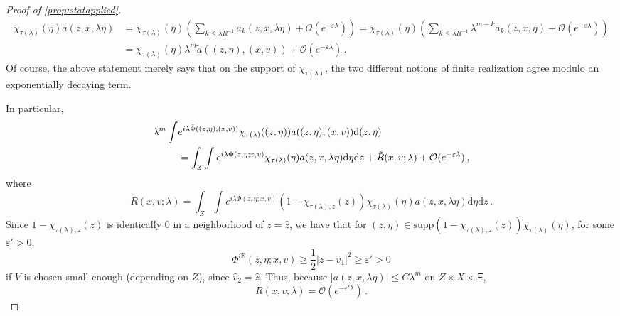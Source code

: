 \documentclass[
	fontsize=11pt, 
	twoside=false, 
	abstract=true, 
	a4paper,
]{scrartcl}
\newcommand{\eps}{\varepsilon}
\newcommand{\RR}{\mathbb{R}}
\newcommand{\dd}{\mathrm{d}}
\newcommand{\abs}[1]{\left\lvert#1\right\rvert}
\newcommand{\supp}{\mathrm{supp}}
\newcommand{\td}[1]{\tilde{#1}}
\begin{document}
\begin{proof}[Proof of \cref{prop:statapplied}]
	\begin{align*}%
		\chi_{\tau(\lambda)}(\eta)a(z,x,\lambda\eta) &= \chi_{\tau(\lambda)}(\eta)\left(\sum_{k \leq \lambda R^{-1}} a_k(z,x,\lambda\eta) + \mathcal{O}(e^{-\eps\lambda})\right) = \chi_{\tau(\lambda)}(\eta)\left(\sum_{k \leq \lambda R^{-1}} \lambda^{m-k}a_k(z,x,\eta) + \mathcal{O}(e^{-\eps\lambda})\right)\\
		&= \chi_{\tau(\lambda)}(\eta) \lambda^m \td{a}((z,\eta),(x,v)) + \mathcal{O}(e^{-\eps\lambda})\,.
	\end{align*}
	Of course, the above statement merely says that on the support of $\chi_{\tau(\lambda)}$, the two different notions of finite realization agree modulo an exponentially decaying term. 

	In particular,
	\begin{align}\label{eq:sameints}
		\lambda^m\int &e^{i\lambda\td{\Phi}((z,\eta),(x,v))}\chi_{\tau(\lambda)}((z,\eta))\td{a}((z,\eta),(x,v))\dd(z,\eta) \\
		&= \int_Z \int e^{i\lambda\Phi(z,\eta;x,v)}\chi_{\tau(\lambda)}(\eta)a(z,x,\lambda\eta)\dd\eta\dd z+ \td{R}(x,v;\lambda)+\mathcal{O}(e^{-\eps\lambda})\,,\notag
	\end{align}
	where
%	
	\[
		\td{R}(x,v;\lambda) =  \int_Z \int e^{i\lambda\Phi(z,\eta;x,v)}(1-\chi_{\tau(\lambda),z}(z))\chi_{\tau(\lambda)}(\eta)a(z,x,\lambda\eta)\dd\eta\dd z\,.
	\]
	Since $1-\chi_{\tau(\lambda),z}(z)$ is identically $0$ in a neighborhood of $z = \hat z$, we have that for $(z,\eta) \in \supp (1-\chi_{\tau(\lambda),z}(z))\chi_{\tau(\lambda)}(\eta)$, for some $\eps' > 0$,
	\[
		\Phi^{i\RR}(z,\eta;x,v) \geq \frac{1}{2}\abs{z-v_1}^2 \geq \eps' > 0
	\]
	if $V$ is chosen small enough (depending on $Z$), since $\hat v_2 = \hat z$. Thus, because $\abs{a(z,x,\lambda\eta)}\leq C\lambda^m$ on $Z\times X\times \Xi$, 
	\begin{equation*}%
	\td{R}(x,v;\lambda) = \mathcal{O}(e^{-\eps'\lambda})\,.

\end{equation*}
\end{proof}
\end{document}
